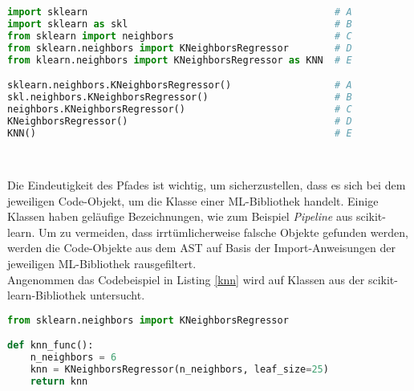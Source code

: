 \documentclass[german,bachelor]{swsLeipzig}
\begin{document}
\noindent\begin{minipage}{\linewidth}
\begin{lstlisting}[language=Python, frame=single, label=import,  basicstyle=\small, caption={Import- und Verwendungsmöglichkeiten der KNeighborsRegressor-Klasse aus scikit-learn},captionpos=b]
import sklearn                                           # A
import sklearn as skl                                    # B
from sklearn import neighbors                            # C
from sklearn.neighbors import KNeighborsRegressor        # D
from klearn.neighbors import KNeighborsRegressor as KNN  # E

sklearn.neighbors.KNeighborsRegressor()                  # A
skl.neighbors.KNeighborsRegressor()                      # B
neighbors.KNeighborsRegressor()                          # C
KNeighborsRegressor()                                    # D
KNN()                                                    # E
\end{lstlisting}
\end{minipage}
\

\noindent Die Eindeutigkeit des Pfades ist wichtig, um sicherzustellen, dass es sich bei dem jeweiligen Code-Objekt, um die Klasse
einer ML-Bibliothek handelt.
Einige Klassen haben geläufige Bezeichnungen, wie zum Beispiel \textit{Pipeline} aus scikit-learn.
Um zu vermeiden, dass irrtümlicherweise falsche Objekte gefunden werden, werden die Code-Objekte aus dem AST auf Basis der
Import-Anweisungen der jeweiligen ML-Bibliothek rausgefiltert.\\
\indent Angenommen das Codebeispiel in Listing \ref{knn} wird auf Klassen aus der scikit-learn-Bibliothek untersucht.\\

\noindent\begin{minipage}{\linewidth}
\begin{lstlisting}[language=Python, frame=single, label=knn,  basicstyle=\small, caption={Codebeispiel mit KNeighborsRegressor-Klasse},captionpos=b]
from sklearn.neighbors import KNeighborsRegressor

def knn_func():
    n_neighbors = 6
    knn = KNeighborsRegressor(n_neighbors, leaf_size=25)
    return knn
\end{lstlisting}
\end{minipage}
\
\end{document}
